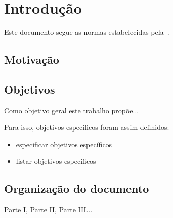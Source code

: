 
\chapter*[Introdução]{Introdução}

Este documento segue as normas estabelecidas pela~. \lipsum[30-34]

\section*{Motivação}\label{sec:motivacao}

\lipsum[35]

\section*{Objetivos}\label{sec:objetivos}

Como objetivo geral este trabalho propõe...

Para isso, objetivos específicos foram assim definidos:

\begin{itemize}
\item especificar objetivos específicos
\item listar objetivos específicos
\end{itemize}

\section*{Organização do documento}\label{sec:objetivos}

Parte I, Parte II, Parte III... \lipsum[32]
